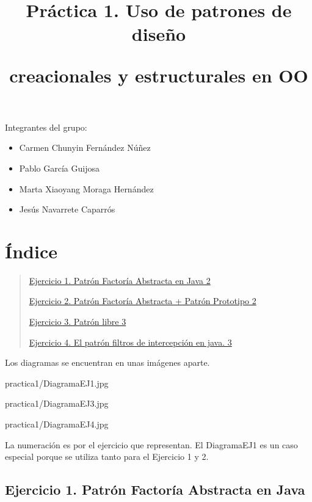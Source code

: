\documentclass[
]{article}
\title{\phantomsection\label{_4dxye01l00ko}{}

\phantomsection\label{_51o6olohl73d}{}

\phantomsection\label{_37s0yi2f6kdl}{}

\phantomsection\label{_cgecg925xc3h}{}Práctica 1. Uso de patrones de
diseño

\phantomsection\label{_x1zz5rcddd5l}{}creacionales y estructurales en
OO}
\author{}
\date{}
\begin{document}
\maketitle

Integrantes del grupo:

\begin{itemize}
\item
  Carmen Chunyin Fernández Núñez
\item
  Pablo García Guijosa
\item
  Marta Xiaoyang Moraga Hernández
\item
  Jesús Navarrete Caparrós
\end{itemize}
\break
\section{Índice}\label{uxedndice}

\hyperref[uxedndice]{\textbf{}}

\begin{quote}
\hyperref[ejercicio-1.-patruxf3n-factoruxeda-abstracta-en-java]{Ejercicio
1. Patrón Factoría Abstracta en Java 2}

\hyperref[ejercicio-2.-patruxf3n-factoruxeda-abstracta-patruxf3n-prototipo]{Ejercicio
2. Patrón Factoría Abstracta + Patrón Prototipo 2}

\hyperref[ejercicio-3.-patruxf3n-libre]{Ejercicio 3. Patrón libre 3}

\hyperref[ejercicio-4.-el-patruxf3n-filtros-de-intercepciuxf3n-en-java.]{Ejercicio
4. El patrón filtros de intercepción en java. 3}
\end{quote}

Los diagramas se encuentran en unas imágenes aparte.

practica1/DiagramaEJ1.jpg

practica1/DiagramaEJ3.jpg

practica1/DiagramaEJ4.jpg

La numeración es por el ejercicio que representan. El DiagramaEJ1 es un
caso especial porque se utiliza tanto para el Ejercicio 1 y 2.

\subsection{\texorpdfstring{\hfill\break
}{ }}\label{section}

\subsection{\texorpdfstring{\textbf{Ejercicio 1. Patrón Factoría
Abstracta en
Java}}{Ejercicio 1. Patrón Factoría Abstracta en Java}}\label{ejercicio-1.-patruxf3n-factoruxeda-abstracta-en-java}
\end{document}
